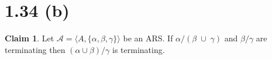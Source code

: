 \documentclass[autodetect-enginem]{article}
\theoremstyle{plain}
\theoremstyle{definition}
\newtheorem*{claim*}{Claim}
\begin{document}
\section*{1.34 (b)}

\begin{claim*}
    Let $\mathcal{A} = \langle A, \{\alpha, \beta, \gamma\} \rangle$ be an ARS.
    If $\alpha/(\beta\;\cup\;\gamma)$ and $\beta/\gamma$ are terminating
    then $(\alpha \cup \beta) / \gamma$ is terminating.
\end{claim*}

\begin{comment}
\begin{proof}
    To prove the claim, we show that $\gamma^*(\alpha\,\cup\,\beta)$ is terminating.
    Assume $\gamma^*(\alpha \cup \beta)$ is not terminating.
    Then we distinguish three cases.
    \begin{itemize}
        \item If $\gamma^*\beta$ is not terminating then it contradicts with the assumption.
        \item If $\gamma^*\alpha$ is not terminating then we have 
        Then $\alpha$ is not terminating. However since $\alpha/(\beta \cup \gamma)$ is terminating,
        $\alpha$ is terminating. Hence we have contradiction.
    \end{itemize}
\end{proof}

\end{comment}
\end{document}
